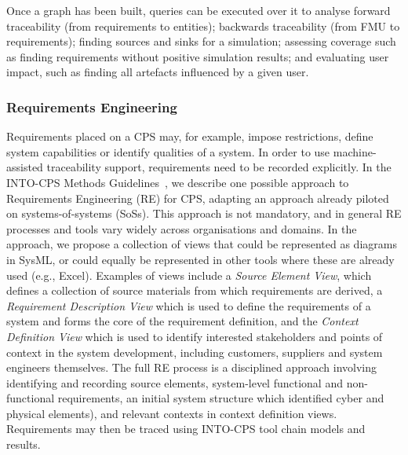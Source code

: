 Once a graph has been built, queries can be executed over it to analyse forward traceability (from requirements to entities); backwards traceability (from FMU to requirements); finding sources and sinks for a simulation; assessing coverage such as finding requirements without positive simulation results; and evaluating user impact, such as finding all artefacts influenced by a given user.

\subsubsection{Requirements Engineering}
\label{sec:method:reqeng}

Requirements placed on a CPS may, for example, impose restrictions, define system capabilities or identify qualities of a system. In order to use machine-assisted traceability support, requirements need to be recorded explicitly. In the INTO-CPS Methods Guidelines~\cite{Pierce&18}, we describe one possible approach to Requirements Engineering (RE) for CPS, adapting an approach already piloted on systems-of-systems (SoSs). This approach is not mandatory, and in general RE processes and tools vary widely across organisations and domains. In the approach, we propose a collection of views that could be represented as diagrams in SysML, or could equally be represented in other tools where these are already used (e.g., Excel). Examples of views include a \emph{Source Element View}, which defines a collection of source materials from which requirements are derived, a \emph{Requirement Description View} which is used to define the requirements of a system and forms the core of the requirement definition, and the \emph{Context Definition View} which is used to identify interested stakeholders and points of context in the system development, including customers, suppliers and system engineers themselves. The full RE process is a disciplined approach involving identifying and recording source elements, system-level functional and non-functional requirements, an initial system structure which identified cyber and physical elements), and relevant contexts in context definition views. Requirements may then be traced using INTO-CPS tool chain models and results.

